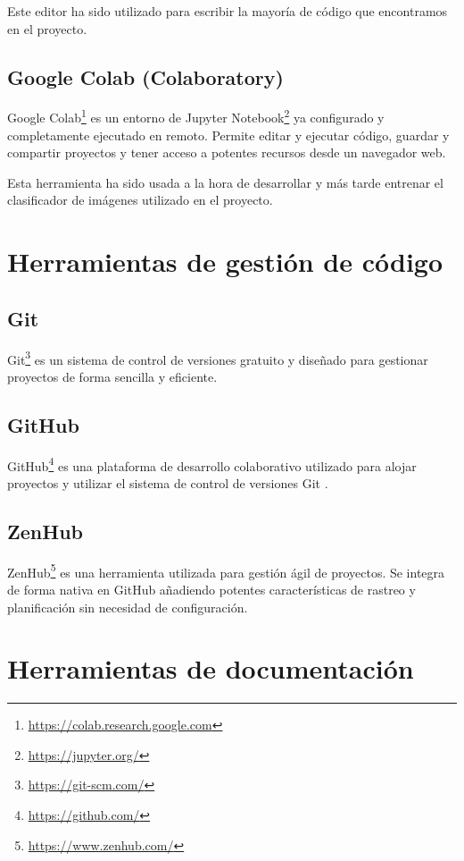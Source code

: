 Este editor ha sido utilizado para escribir la mayoría de código que encontramos en el proyecto.


\subsection{Google Colab (Colaboratory)}
Google Colab\footnote{\url{https://colab.research.google.com}} es un entorno de Jupyter Notebook\footnote{\url{https://jupyter.org/}} ya configurado y completamente ejecutado en remoto. Permite editar y ejecutar código, guardar y compartir proyectos y tener acceso a potentes recursos desde un navegador web.

Esta herramienta ha sido usada a la hora de desarrollar y más tarde entrenar el clasificador de imágenes utilizado en el proyecto.


\section{Herramientas de gestión de código}


\subsection{Git}
 Git\footnote{\url{https://git-scm.com/}} es un sistema de control de versiones gratuito y  diseñado para gestionar proyectos de forma sencilla y eficiente.

\subsection{GitHub}
GitHub\footnote{\url{https://github.com/}} es una plataforma de desarrollo colaborativo utilizado para alojar proyectos y utilizar el sistema de control de versiones Git \cite{wiki:github}.

\subsection{ZenHub}
ZenHub\footnote{\url{https://www.zenhub.com/}} es una herramienta utilizada para gestión ágil de proyectos. Se integra de forma nativa en GitHub añadiendo potentes características de rastreo y planificación sin necesidad de configuración.

\section{Herramientas de documentación}

